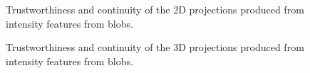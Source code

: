 \clearpage

\clearpage
\begin{figure}[H]
	\centering
	\caption{Trustworthiness and continuity of the 2D projections produced from intensity features from blobs.}\label{fig:TC_2d_blobs}
\end{figure}

\begin{figure}[H]
	\centering
	\caption{Trustworthiness and continuity of the 3D projections produced from intensity features from blobs.}\label{fig:TC_3d_blobs}
\end{figure}

